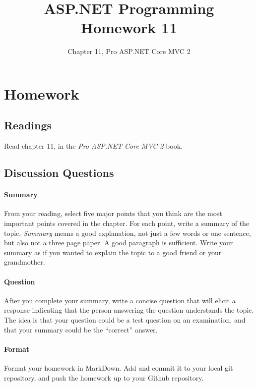 \documentclass{article}
\title{ASP.NET Programming Homework 11}
\author{Chapter 11, Pro ASP.NET Core MVC 2}
\date{}
\begin{document}
    

    \maketitle{}
    \thispagestyle{fancy}

    \section*{Homework}

        \subsection*{Readings}

        Read chapter 11, in the \textit{Pro ASP.NET Core MVC 2} book.
        
        \subsection*{Discussion Questions}

        \paragraph{Summary} From your reading, select five major points that you think are the most important points covered in the chapter. For each point, write a summary of the topic. \textit{Summary} means a good explanation, not just a few words or one sentence, but also not a three page paper. A good paragraph is sufficient. Write your summary as if you wanted to explain the topic to a good friend or your grandmother. 

        \paragraph{Question} After you complete your summary, write a concise question that will elicit a response indicating that the person answering the question understands the topic. The idea is that your question could be a test question on an examination, and that your summary could be the ``correct'' answer.

        \paragraph{Format} Format your homework in MarkDown. Add and commit it to your local git repository, and push the homework up to your Github repository.
\end{document}
